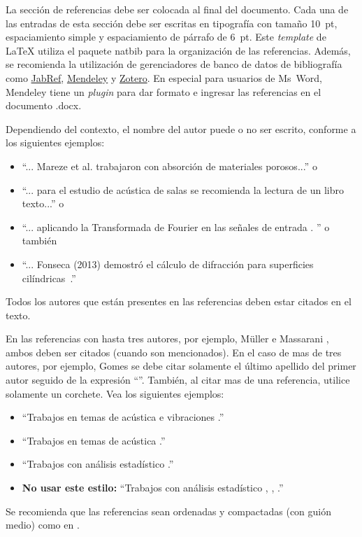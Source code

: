 \documentclass[12pt, a4paper, twoside, twocolumn]{article}
\begin{document}

La sección de referencias debe ser colocada al final del documento.  Cada una de las entradas de esta sección debe ser escritas en tipografía con tamaño 10~pt, espaciamiento simple y espaciamiento de párrafo de 6~pt. Este \textit{template} de \LaTeX\xspace utiliza el paquete {\ttfamily natbib} para la organización de las referencias. Además, se recomienda la utilización de gerenciadores de banco de datos de bibliografía como \href{http://www.jabref.org/}{JabRef}, \href{http://www.mendeley.com}{Mendeley} y \href{https://www.zotero.org/}{Zotero}. En especial para usuarios de Ms~Word, Mendeley tiene un \textit{plugin} para dar formato e ingresar las referencias en el documento .docx.

Dependiendo del contexto, el nombre del autor puede o no ser escrito, conforme a los siguientes ejemplos:
%
\begin{itemize}[noitemsep,topsep=0ex] \itemsep=4pt
	\item 	``... Mareze et al. \cite{Mareze-2019} trabajaron con absorción de materiales porosos...'' o
	\item ``... para el estudio de acústica de salas \cite{Brandao-2017} se recomienda la lectura de un libro texto...'' o
	\item ``... aplicando la Transformada de Fourier en las señales de entrada \cite{Oppenheim-2010}. '' o también
	\item ``... Fonseca (2013) demostró el cálculo de difracción para superficies cilíndricas~\cite{Fonseca-2013}.''
\end{itemize}
%
Todos los autores que están presentes en las referencias deben estar citados en el texto.

En las referencias con hasta tres autores, por ejemplo, Müller e Massarani \cite{Muller-2001}, ambos deben ser citados (cuando son mencionados). En el caso de mas de tres autores, por ejemplo,  Gomes \etal \cite{Gomes-2015} se debe citar solamente el último apellido del primer autor seguido de la expresión ``\etal''. También, al citar mas de una referencia, utilice solamente un corchete. Vea los siguientes ejemplos:
%
\begin{itemize}[noitemsep,topsep=0ex] \itemsep=8pt
	\item 	``Trabajos en temas de acústica e vibraciones \cite{Mareze-2017,Fonseca-2013,Brandao-2017}.''
	\item ``Trabajos en temas de acústica \cite{Mareze-2017,Oppenheim-2010,Muller-2001,Mareze-2019}.''
	\item ``Trabajos con análisis estadístico \cite{Mareze-2017, Brandao-2017, Borges-2018}.''
		\item \textbf{No usar este estilo:} ``Trabajos con análisis estadístico \cite{Mareze-2017}, \cite{Brandao-2017}, \cite{Ristow-2016}.''
\end{itemize}
%
Se recomienda que las referencias sean ordenadas y compactadas (con guión medio) como en \cite{Mareze-2017,Oppenheim-2010,Muller-2001,Mareze-2019}.
\end{document}
